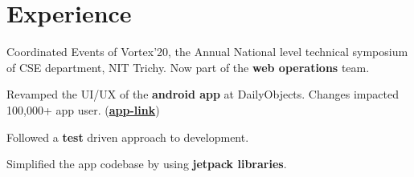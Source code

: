 \documentclass[]{deedy-resume-openfont}
\begin{document}
\begin{minipage}[t]{0.67\textwidth} 


\section{Experience}

\vspace{\topsep} %
\begin{tightemize}
\item Coordinated Events of Vortex’20, the Annual National level technical symposium of CSE department, NIT Trichy. Now part of the \textbf{web operations} team.
\end{tightemize}
\sectionsep

\begin{tightemize}
\item Revamped the UI/UX of the \textbf{android app} at DailyObjects. Changes impacted 100,000+ app user. (\textbf{\href{https://play.google.com/store/apps/details?id=com.dailyobjects}{app-link}}) 
\item Followed a \textbf{test} driven approach to development.
\item Simplified the app codebase by using \textbf{jetpack libraries}.
\end{tightemize}
\sectionsep



\end{minipage}
\end{document}
